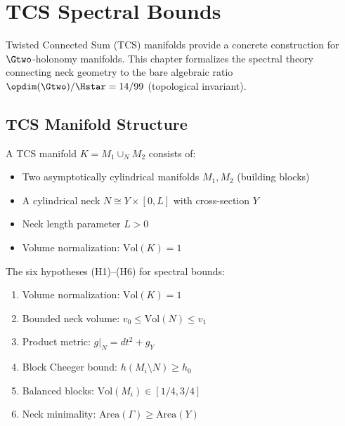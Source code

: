 \chapter{TCS Spectral Bounds}\label{chap:tcs}

Twisted Connected Sum (TCS) manifolds provide a concrete construction for $\Gtwo$-holonomy
manifolds. This chapter formalizes the spectral theory connecting neck geometry to
the bare algebraic ratio $\opdim(\Gtwo)/\Hstar = 14/99$ (topological invariant).

\section{TCS Manifold Structure}

\begin{definition}\label{def:TCSManifold}
    \leanok
    A TCS manifold $K = M_1 \cup_N M_2$ consists of:
    \begin{itemize}
        \item Two asymptotically cylindrical manifolds $M_1, M_2$ (building blocks)
        \item A cylindrical neck $N \cong Y \times [0, L]$ with cross-section $Y$
        \item Neck length parameter $L > 0$
        \item Volume normalization: $\mathrm{Vol}(K) = 1$
    \end{itemize}
\end{definition}

\begin{definition}\label{def:TCSHypotheses}
    \leanok
    The six hypotheses (H1)--(H6) for spectral bounds:
    \begin{enumerate}
        \item[(H1)] Volume normalization: $\mathrm{Vol}(K) = 1$
        \item[(H2)] Bounded neck volume: $v_0 \leq \mathrm{Vol}(N) \leq v_1$
        \item[(H3)] Product metric: $g|_N = dt^2 + g_Y$
        \item[(H4)] Block Cheeger bound: $h(M_i \setminus N) \geq h_0$
        \item[(H5)] Balanced blocks: $\mathrm{Vol}(M_i) \in [1/4, 3/4]$
        \item[(H6)] Neck minimality: $\mathrm{Area}(\Gamma) \geq \mathrm{Area}(Y)$
    \end{enumerate}
\end{definition}

